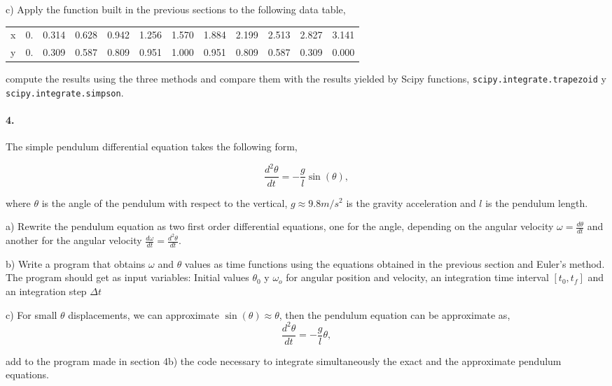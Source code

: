 c) Apply the function built in the previous sections to the following data table,

\begin{tabular}{r r r r r r r r r r r r}
\hline
x & 0. &0.314 & 	0.628 &	0.942 &	1.256 &	1.570 &	1.884 &	 2.199 &	2.513 &	 2.827 &	3.141\\
y & 0. &0.309 &	0.587 &	0.809 &	0.951 &	1.000 &	0.951 &    0.809 &	0.587 &	0.309 &	0.000\\
\hline
\end{tabular}


\noindent compute the results using the three methods and compare them with the results yielded by Scipy functions, \texttt{scipy.integrate.trapezoid} y \texttt{scipy.integrate.simpson}.

\paragraph{4.} The simple pendulum differential equation takes the following form, 

\begin{equation*}
\frac{d^2\theta}{dt} =-\frac{g}{l}\sin(\theta),
\end{equation*}

where $\theta$ is the angle of the pendulum with respect to the vertical, $g \approx 9.8 m/s^2$ is the gravity acceleration and $l$ is the pendulum length.

a) Rewrite the pendulum equation as two first order differential equations, one for the angle, depending on the angular velocity $\omega = \frac{d\theta}{dt}$ and another for the angular velocity $\frac{d\omega}{dt} = \frac{d^2\theta}{dt}$.

b) Write a program that obtains $\omega$ and $\theta$ values as time functions using the equations obtained in the previous section and Euler's method. The program should get as input variables: Initial values $\theta_0$ y $\omega_o$  for angular position and velocity, an integration time interval $[t_0,t_f]$ and an integration step $\Delta t$

c) For small $\theta$ displacements, we can approximate $ \sin(\theta) \approx \theta$, then the pendulum equation can be approximate as,   
\begin{equation*}
\frac{d^2\theta}{dt} =-\frac{g}{l}\theta,
\end{equation*}

\noindent add to the program made in section 4b) the code necessary to integrate simultaneously the exact and the approximate pendulum equations.

